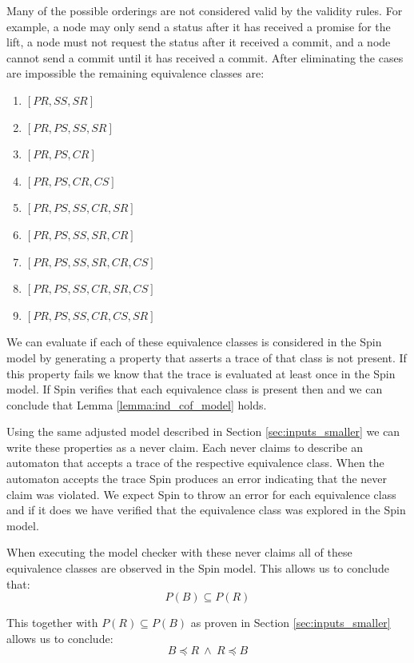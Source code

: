 \documentclass[runningheads]{llncs}
\begin{document}
Many of the possible orderings are not considered valid by the validity rules. For example, a node may only send a status after it has received a promise for the lift, a node must not request the status after it received a commit, and a node cannot send a commit until it has received a commit. 
After eliminating the cases are impossible the remaining equivalence classes are:
\begin{enumerate}
    \item $[PR, SS, SR]$
    \item $[PR, PS, SS, SR]$
    \item $[PR, PS, CR]$
    \item $[PR, PS, CR, CS]$
    \item $[PR, PS, SS, CR, SR]$
    \item $[PR, PS, SS, SR, CR]$
    \item $[PR, PS, SS, SR, CR, CS]$
    \item $[PR, PS, SS, CR, SR, CS]$
    \item $[PR, PS, SS, CR, CS, SR]$
\end{enumerate}

We can evaluate if each of these equivalence classes is considered in the Spin model by generating a property that asserts a trace of that class is not present. If this property fails we know that the trace is evaluated at least once in the Spin model. If Spin verifies that each equivalence class is present then and we can conclude that Lemma \ref{lemma:ind_cof_model} holds.

Using the same adjusted model described in Section \ref{sec:inputs_smaller} we can write these properties as a never claim. Each never claims to describe an automaton that accepts a trace of the respective equivalence class. When the automaton accepts the trace Spin produces an error indicating that the never claim was violated. We expect Spin to throw an error for each equivalence class and if it does we have verified that the equivalence class was explored in the Spin model. 

When executing the model checker with these never claims all of these equivalence classes are observed in the Spin model. This allows us to conclude that:
$$P(B) \subseteq P(R)$$

This together with $P(R) \subseteq P(B)$ as proven in Section \ref{sec:inputs_smaller} allows us to conclude:
$$B \preceq R\  \wedge\  R \preceq B$$
    
\end{document}

